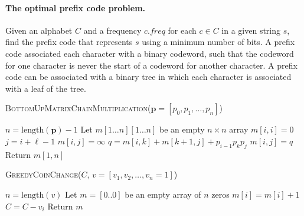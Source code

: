 \documentclass[11  pt]{exam}
\begin{document}
    \paragraph{The optimal prefix code problem.} Given an alphabet $C$ and a frequency $\mathit{c.freq}$ for each $c \in C$ in a given string $s$,  find the prefix code that represents $s$ using a minimum number of bits. A prefix code associated each character with a binary codeword, such that the codeword for one character is never the start of a codeword for another character. A prefix code can be associated with a binary tree in which each character is associated with a leaf of the tree.
    
    
    \noindent    \textsc{BottomUpMatrixChainMultiplication}($\textbf{p} = [p_0, p_1, \hdots, p_n]$)
    \begin{algorithmic}
        \State $n = \text{length}(\textbf{p})-1$
        \State Let $m[1 \hdots n][1 \hdots n]$ be an empty $n \times n$ array
        \State $m[i,i] = 0$
        \EndFor
        \State $j = i+\ell - 1$ 
        \State $m[i,j] = \infty$
        \State $q = m[i,k] + m[k+1,j] + p_{i-1}p_k p_j$
        \State $m[i,j] = q$
        \EndIf
        \EndFor
        \EndFor
        \EndFor
        \State Return $m[1,n]$
    \end{algorithmic}
    
    \noindent\textsc{GreedyCoinChange}($C$, $v = [v_1, v_2, \hdots , v_n = 1]$)
    \begin{algorithmic}
        \State $n = \text{length}(v)$
        \State Let $m = [0..0]$ be an empty array of $n$ zeros
        \State $m[i] = m[i] + 1$
        \State $C = C - v_i$
        \EndWhile
        \EndFor
        \State Return $m$
    \end{algorithmic}
\end{document}
